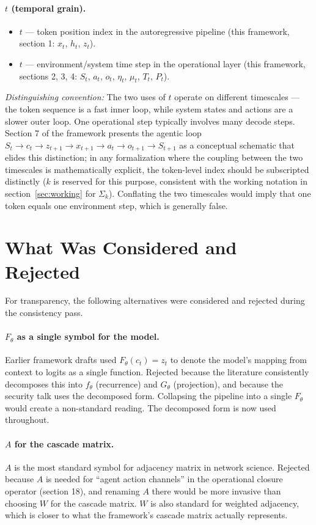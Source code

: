 \documentclass[11pt]{article}
\begin{document}
\paragraph{$t$ (temporal grain).}
\begin{itemize}
\item $t$ --- token position index in the autoregressive pipeline (this framework, section 1: $x_t$, $h_t$, $z_t$).
\item $t$ --- environment/system time step in the operational layer (this framework, sections 2, 3, 4: $S_t$, $a_t$, $o_t$, $\eta_t$, $\mu_t$, $T_t$, $P_t$).
\end{itemize}
\textit{Distinguishing convention:} The two uses of $t$ operate on different timescales --- the token sequence is a fast inner loop, while system states and actions are a slower outer loop. One operational step typically involves many decode steps. Section 7 of the framework presents the agentic loop $S_t \to c_t \to z_{t+1} \to x_{t+1} \to a_t \to o_{t+1} \to S_{t+1}$ as a conceptual schematic that elides this distinction; in any formalization where the coupling between the two timescales is mathematically explicit, the token-level index should be subscripted distinctly ($k$ is reserved for this purpose, consistent with the working notation in section~\ref{sec:working} for $\Sigma_k$). Conflating the two timescales would imply that one token equals one environment step, which is generally false.

\section{What Was Considered and Rejected}

For transparency, the following alternatives were considered and rejected during the consistency pass.

\paragraph{$F_\theta$ as a single symbol for the model.} Earlier framework drafts used $F_\theta(c_t) = z_t$ to denote the model's mapping from context to logits as a single function. Rejected because the literature consistently decomposes this into $f_\theta$ (recurrence) and $G_\theta$ (projection), and because the security talk uses the decomposed form. Collapsing the pipeline into a single $F_\theta$ would create a non-standard reading. The decomposed form is now used throughout.

\paragraph{$A$ for the cascade matrix.} $A$ is the most standard symbol for adjacency matrix in network science. Rejected because $A$ is needed for ``agent action channels'' in the operational closure operator (section 18), and renaming $A$ there would be more invasive than choosing $W$ for the cascade matrix. $W$ is also standard for weighted adjacency, which is closer to what the framework's cascade matrix actually represents.
\end{document}
